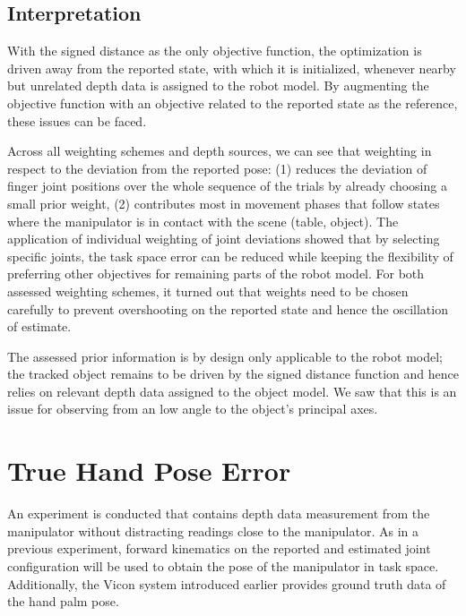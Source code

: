 \subsection{Interpretation}

With the signed distance as the only objective function, the optimization is driven away from the reported state, with which it is initialized, whenever nearby but unrelated depth data is assigned to the robot model. By augmenting the objective function with an objective related to the reported state as the reference, these issues can be faced.

Across all weighting schemes and depth sources, we can see that weighting in respect to the deviation from the reported pose: (1) reduces the deviation of finger joint positions over the whole sequence of the trials by already choosing a small prior weight, (2) contributes most in movement phases that follow states where the manipulator is in contact with the scene (table, object). The application of individual weighting of joint deviations showed that by selecting specific joints, the task space error can be reduced while keeping the flexibility of preferring other objectives for remaining parts of the robot model. For both assessed weighting schemes, it turned out that weights need to be chosen carefully to prevent overshooting on the reported state and hence the oscillation of estimate.

The assessed prior information is by design only applicable to the robot model; the tracked object remains to be driven by the signed distance function and hence relies on relevant depth data assigned to the object model. We saw that this is an issue for observing from an low angle to the object's principal axes.

\section{True Hand Pose Error}

An experiment is conducted that contains depth data measurement from the manipulator without distracting readings close to the manipulator. As in a previous experiment, forward kinematics on the reported and estimated joint configuration will be used to obtain the pose of the manipulator in task space. Additionally, the Vicon system introduced earlier provides ground truth data of the hand palm pose.




